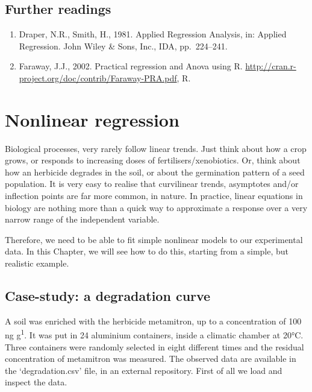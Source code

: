 \documentclass[a4paper,12pt,oneside]{book}
\providecommand{\tightlist}{%
  \setlength{\itemsep}{0pt}\setlength{\parskip}{0pt}}
\begin{document}
\hypertarget{further-readings-10}{%
\section{Further readings}\label{further-readings-10}}

\begin{enumerate}
\def\labelenumi{\arabic{enumi}.}
\tightlist
\item
  Draper, N.R., Smith, H., 1981. Applied Regression Analysis, in: Applied Regression. John Wiley \& Sons, Inc., IDA, pp.~224--241.
\item
  Faraway, J.J., 2002. Practical regression and Anova using R. \url{http://cran.r-project.org/doc/contrib/Faraway-PRA.pdf}, R.
\end{enumerate}

\hypertarget{nonlinear-regression}{%
\chapter{Nonlinear regression}\label{nonlinear-regression}}

Biological processes, very rarely follow linear trends. Just think about how a crop grows, or responds to increasing doses of fertilisers/xenobiotics. Or, think about how an herbicide degrades in the soil, or about the germination pattern of a seed population. It is very easy to realise that curvilinear trends, asymptotes and/or inflection points are far more common, in nature. In practice, linear equations in biology are nothing more than a quick way to approximate a response over a very narrow range of the independent variable.

Therefore, we need to be able to fit simple nonlinear models to our experimental data. In this Chapter, we will see how to do this, starting from a simple, but realistic example.

\hypertarget{case-study-a-degradation-curve}{%
\section{Case-study: a degradation curve}\label{case-study-a-degradation-curve}}

A soil was enriched with the herbicide metamitron, up to a concentration of 100 ng g\textsuperscript{1}. It was put in 24 aluminium containers, inside a climatic chamber at 20°C. Three containers were randomly selected in eight different times and the residual concentration of metamitron was measured. The observed data are available in the `degradation.csv' file, in an external repository. First of all we load and inspect the data.
\end{document}
